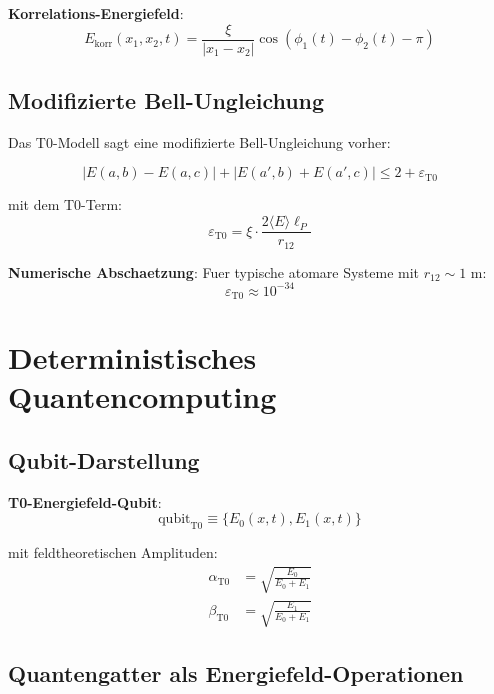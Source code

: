 \documentclass[12pt,a4paper]{article}
\newcommand{\xipar}{\xi}
\begin{document}
	\textbf{Korrelations-Energiefeld}:
	\begin{equation}
		\boxed{E_{\mathrm{korr}}(x_1, x_2, t) = \frac{\xipar}{|x_1 - x_2|} \cos(\phi_1(t) - \phi_2(t) - \pi)}
		\label{eq:korrelationsfeld}
	\end{equation}
	
	\subsection{Modifizierte Bell-Ungleichung}
	
	Das T0-Modell sagt eine modifizierte Bell-Ungleichung vorher:
	
	\begin{equation}
		\boxed{|E(a,b) - E(a,c)| + |E(a',b) + E(a',c)| \leq 2 + \varepsilon_{\mathrm{T0}}}
	\end{equation}
	
	mit dem T0-Term:
	\begin{equation}
		\boxed{\varepsilon_{\mathrm{T0}} = \xipar \cdot \frac{2\langle E \rangle \ell_P}{r_{12}}}
		\label{eq:bell_korrektur}
	\end{equation}
	
	\textbf{Numerische Abschaetzung}:
	Fuer typische atomare Systeme mit $r_{12} \sim 1$ m:
	\begin{equation}
		\varepsilon_{\mathrm{T0}} \approx 10^{-34}
	\end{equation}
	
	\section{Deterministisches Quantencomputing}
	
	\subsection{Qubit-Darstellung}
	
	\textbf{T0-Energiefeld-Qubit}:
	\begin{equation}
		\boxed{\text{qubit}_{\mathrm{T0}} \equiv \{E_0(x,t), E_1(x,t)\}}
	\end{equation}
	
	mit feldtheoretischen Amplituden:
	\begin{align}
		\alpha_{\mathrm{T0}} &= \sqrt{\frac{E_0}{E_0 + E_1}} \\
		\beta_{\mathrm{T0}} &= \sqrt{\frac{E_1}{E_0 + E_1}}
	\end{align}
	
	\subsection{Quantengatter als Energiefeld-Operationen}
	
\end{document}
